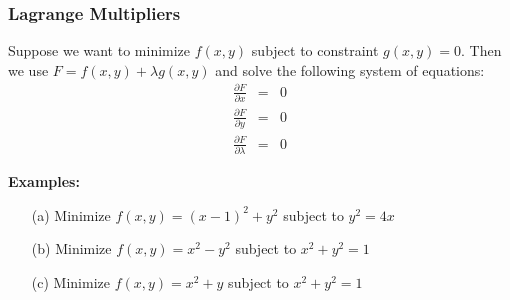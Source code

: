 \documentclass{beamer}
\begin{document}
\begin{frame}
\frametitle{Lagrange Multipliers}
Suppose we want to minimize $f(x,y)$ subject to constraint $g(x,y)=0$. Then we use $F=f(x,y) + \lambda g(x,y)$ and solve the following system of equations:
\begin{eqnarray*}
	\frac{\partial F}{\partial x} &=& 0\\
	\frac{\partial F}{\partial y} &=& 0\\
	\frac{\partial F}{\partial \lambda} &=& 0
\end{eqnarray*}

\vspace{6pt}
\textbf{Examples:}
\begin{itemize}
	\item[(a)] Minimize $f(x,y) = (x-1)^2 +y^2$ subject to $y^2=4x$
	\item[(b)] Minimize $f(x,y) = x^2-y^2$ subject to $x^2+y^2 = 1$
	\item[(c)] Minimize $f(x,y) = x^2 + y$ subject to $x^2+y^2 = 1$
	
\end{itemize}
\end{frame}



%		
%		
%
%
%
%
\end{document}
